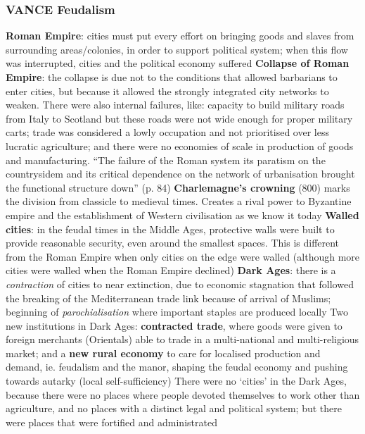 \documentclass{article}
\begin{document}
\subsubsection{VANCE Feudalism}

\begin{outline}
	\1 \textbf{Roman Empire}: cities must put every effort on bringing goods and slaves from surrounding areas/colonies, in order to support political system; when this flow was interrupted, cities and the political economy suffered
		\2 \textbf{Collapse of Roman Empire}: the collapse is due not to the conditions that allowed barbarians to enter cities, but because it allowed the strongly integrated city networks to weaken. There were also internal failures, like: capacity to build military roads from Italy to Scotland but these roads were not wide enough for proper military carts; trade was considered a lowly occupation and not prioritised over less lucratic agriculture; and there were no economies of scale in production of goods and manufacturing. ``The failure of the Roman system its paratism on the countrysidem and its critical dependence on the network of urbanisation brought the functional structure down'' (p. 84)
		\2 \textbf{Charlemagne's crowning} (800) marks the division from classicle to medieval times. Creates a rival power to Byzantine empire and the establishment of Western civilisation as we know it today
	\1 \textbf{Walled cities}: in the feudal times in the Middle Ages, protective walls were built to provide reasonable security, even around the smallest spaces. This is different from the Roman Empire when only cities on the edge were walled (although more cities were walled when the Roman Empire declined)
	\1 \textbf{Dark Ages}: there is a \textit{contraction} of cities to near extinction, due to economic stagnation that followed the breaking of the Mediterranean trade link because of arrival of Muslims; beginning of \textit{parochialisation} where important staples are produced locally
		\2 Two new institutions in Dark Ages: \textbf{contracted trade}, where goods were given to foreign merchants (Orientals) able to trade in a multi-national and multi-religious market; and a \textbf{new rural economy} to care for localised production and demand, ie. feudalism and the manor, shaping the feudal economy and pushing towards autarky (local self-sufficiency)
		\2 There were no `cities' in the Dark Ages, because there were no places where people devoted themselves to work other than agriculture, and no places with a distinct legal and political system; but there were places that were fortified and administrated

\end{outline}
\end{document}
